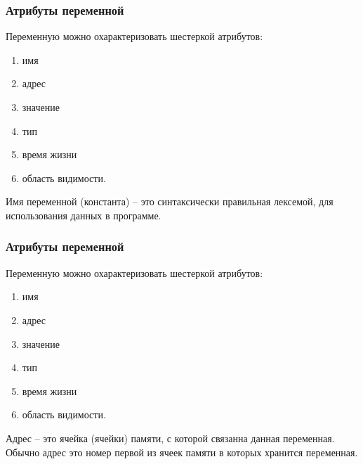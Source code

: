 	\begin{frame}
\frametitle{Атрибуты переменной}



Переменную можно охарактеризовать шестеркой атрибутов:
\setlength{\columnsep}{0.4cm}
\begin{multicols}{2}
\begin{enumerate}
\item имя
\item адрес
\item значение
\item тип
\item время жизни
\item область видимости.
\end{enumerate}

\columnbreak
 
Имя переменной (константа) – это синтаксически правильная лексемой, для использования данных в программе.

\end{multicols}

\end{frame}

	\begin{frame}
\frametitle{Атрибуты переменной}



Переменную можно охарактеризовать шестеркой атрибутов:
\setlength{\columnsep}{0.4cm}
\begin{multicols}{2}
\begin{enumerate}
\item имя
\item адрес
\item значение
\item тип
\item время жизни
\item область видимости.
\end{enumerate}

\columnbreak
 
Адрес – это ячейка (ячейки) памяти, с которой связанна данная переменная. Обычно адрес это номер первой из ячеек памяти в которых хранится переменная.

\end{multicols}




\end{frame}

